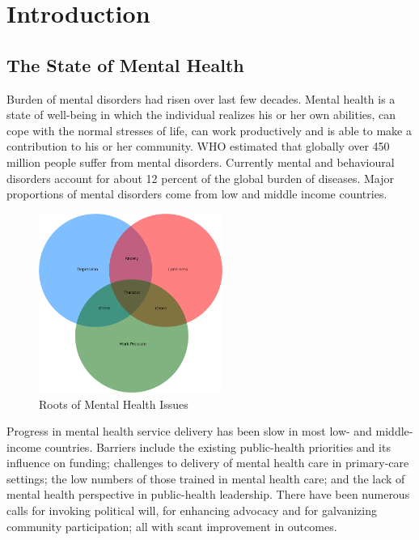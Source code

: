 \chapter{Introduction}

\pagebreak

\section{The State of Mental Health}

Burden of mental disorders had risen over last few decades. Mental health is a state of well-being in which the individual realizes his or her own abilities, can cope with the normal stresses of life, can work productively and is able to make a contribution to his or her community. WHO estimated that globally over 450 million people suffer from mental disorders. Currently mental and behavioural disorders account for about 12 percent of the global burden of diseases. Major proportions of mental disorders come from low and middle income countries.

\begin{figure}[H]
    \centering
    \includegraphics[width=6cm]{images/roots-mental-health-issues.png}
    \caption{Roots of Mental Health Issues}
    \label{fig:roots-mental-health-issues}
\end{figure}

Progress in mental health service delivery has been slow in most low- and middle-income countries. Barriers include the existing public-health priorities and its influence on funding; challenges to delivery of mental health care in primary-care settings; the low numbers of those trained in mental health care; and the lack of mental health perspective in public-health leadership. There have been numerous calls for invoking political will, for enhancing advocacy and for galvanizing community participation; all with scant improvement in outcomes.

